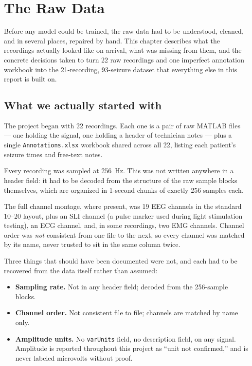 \chapter{The Raw Data}
\label{chap:rawdata}

Before any model could be trained, the raw data had to be understood, cleaned, and in several
places, repaired by hand. This chapter describes what the recordings actually looked like on
arrival, what was missing from them, and the concrete decisions taken to turn 22 raw recordings
and one imperfect annotation workbook into the 21-recording, 93-seizure dataset that everything
else in this report is built on.

\section{What we actually started with}

The project began with 22 recordings. Each one is a pair of raw MATLAB files --- one holding the
signal, one holding a header of technician notes --- plus a single \texttt{Annotations.xlsx}
workbook shared across all 22, listing each patient's seizure times and free-text notes.

Every recording was sampled at 256~Hz. This was not written anywhere in a header field: it had
to be decoded from the structure of the raw sample blocks themselves, which are organized in
1-second chunks of exactly 256 samples each.

The full channel montage, where present, was 19 EEG channels in the standard 10--20 layout, plus
an SLI channel (a pulse marker used during light stimulation testing), an ECG channel, and, in
some recordings, two EMG channels. Channel order was \emph{not} consistent from one file to the
next, so every channel was matched by its name, never trusted to sit in the same column twice.

Three things that should have been documented were not, and each had to be recovered from the
data itself rather than assumed:

\begin{itemize}[leftmargin=1.4em]
  \item \textbf{Sampling rate.} Not in any header field; decoded from the 256-sample blocks.
  \item \textbf{Channel order.} Not consistent file to file; channels are matched by name only.
  \item \textbf{Amplitude units.} No \texttt{varUnits} field, no description field, on any
    signal. Amplitude is reported throughout this project as ``unit not confirmed,'' and is
    never labeled microvolts without proof.
\end{itemize}

